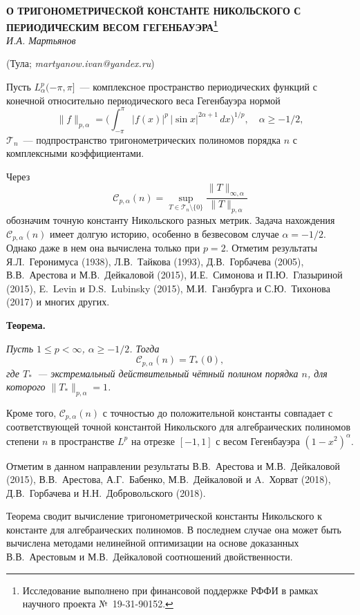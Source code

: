 \begin{center}
    {\bf О ТРИГОНОМЕТРИЧЕСКОЙ КОНСТАНТЕ НИКОЛЬСКОГО С ПЕРИОДИЧЕСКИМ ВЕСОМ ГЕГЕНБАУЭРА\footnote{Исследование выполнено при финансовой поддержке РФФИ в рамках научного проекта №~19-31-90152.}}\\

    {\it И.А. Мартьянов}

    (Тула; {\it martyanow.ivan@yandex.ru})
\end{center}


Пусть $L_{\alpha}^{p}(-\pi,\pi]$~--- комплексное пространство периодических
функций с конечной относительно периодического веса Гегенбауэра нормой
\[
\|f\|_{p,\alpha}=\biggl(\int_{-\pi}^{\pi}|f(x)|^{p}\,|\!\sin
x|^{2\alpha+1}\,dx\biggr)^{1/p},\quad \alpha\ge -1/2,
\]
$\mathcal{T}_{n}$~--- подпространство тригонометрических полиномов порядка $n$
с комплексными коэффициентами.

Через
\[
\mathcal{C}_{p,\alpha}(n)=\sup_{T\in \mathcal{T}_{n}\setminus \{0\}}
\frac{\|T\|_{\infty,\alpha}}{\|T\|_{p,\alpha}}
\]
обозначим точную константу Никольского разных метрик. Задача нахождения
$\mathcal{C}_{p,\alpha}(n)$ имеет долгую историю, особенно в безвесовом случае
$\alpha=-1/2$. Однако даже в нем она вычислена только при $p=2$. Отметим
результаты Я.Л.~Геронимуса (1938), Л.В.~Тайкова (1993), Д.В.~Горбачева (2005),
В.В.~Арестова и М.В.~Дейкаловой (2015), И.Е.~Симонова и П.Ю.~Глазыриной (2015),
E.~Levin и D.S.~Lubinsky (2015), М.И.~Ганзбурга и С.Ю.~Тихонова (2017) и многих
других.

\textbf{Теорема.} {\it Пусть $1\le p<\infty$, $\alpha\ge -1/2$. Тогда
\[
\mathcal{C}_{p,\alpha}(n)=T_{*}(0),
\]
где $T_{*}$~--- экстремальный действительный чётный полином порядка $n$, для
которого $\|T_{*}\|_{p,\alpha}=1$.

Кроме того, $\mathcal{C}_{p,\alpha}(n)$ с точностью до положительной константы
совпадает с соответствующей точной константой Никольского для алгебраических
полиномов степени $n$ в пространстве $L^{p}$ на отрезке $[-1,1]$ с весом
Гегенбауэра $(1-x^{2})^{\alpha}$.}

Отметим в данном направлении результаты В.В.~Арестова и М.В.~Дейкаловой (2015),
В.В.~Арестова, А.Г.~Бабенко, М.В.~Дейкаловой и A.~Хорват (2018), Д.В.~Горбачева
и Н.Н.~Добровольского (2018).

Теорема сводит вычисление тригонометрической константы Никольского к константе
для алгебраических полиномов. В последнем случае она может быть вычислена
методами нелинейной оптимизации на основе доказанных В.В.~Арестовым и
М.В.~Дейкаловой соотношений двойственности.

